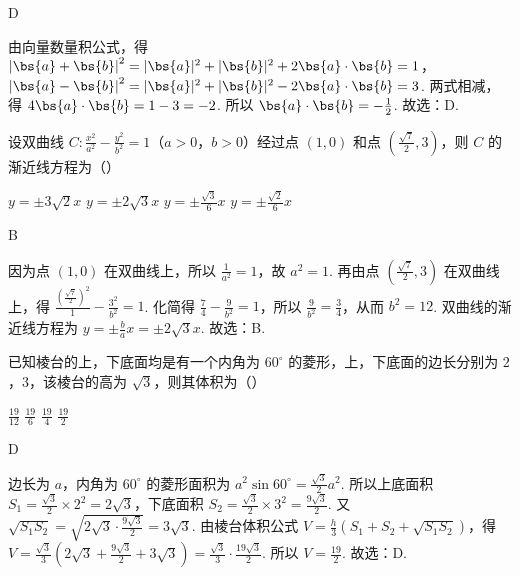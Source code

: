 \documentclass[UTF8,a4paper,oneside,11pt]{ctexbook}
\begin{document}
\begin{answer}
D
\end{answer}

\begin{solution}
由向量数量积公式，得 \(\left| \bs{a}+\bs{b} \right|^2=\lvert \bs{a} \rvert^2+\lvert \bs{b} \rvert^2+2\bs{a}\cdot \bs{b}=1\)，\(\left| \bs{a}-\bs{b} \right|^2=\lvert \bs{a} \rvert^2+\lvert \bs{b} \rvert^2-2\bs{a}\cdot \bs{b}=3\). 两式相减，得 \(4\bs{a}\cdot \bs{b}=1-3=-2\). 所以 \(\bs{a}\cdot \bs{b}=-\frac{1}{2}\). 故选：D.
\end{solution}

\begin{problem}
设双曲线 \(C:\frac{x^2}{a^2}-\frac{y^2}{b^2}=1\)（\(a>0\)，\(b>0\)）经过点 \(\left( 1,0 \right)\) 和点 \(\left( \frac{\sqrt{7}}{2},3 \right)\)，则 \(C\) 的渐近线方程为（\quad）

\choices
    {\(y=\pm 3\sqrt{2}x\)}
    {\(y=\pm 2\sqrt{3}x\)}
    {\(y=\pm \frac{\sqrt{3}}{6}x\)}
    {\(y=\pm \frac{\sqrt{2}}{6}x\)}
\end{problem}

\begin{answer}
B
\end{answer}

\begin{solution}
因为点 \(\left( 1,0 \right)\) 在双曲线上，所以 \(\frac{1}{a^2}=1\)，故 \(a^2=1\).
再由点 \(\left( \frac{\sqrt{7}}{2},3 \right)\) 在双曲线上，得 \(\frac{\left( \frac{\sqrt{7}}{2} \right)^2}{1}-\frac{3^2}{b^2}=1\). 化简得 \(\frac{7}{4}-\frac{9}{b^2}=1\)，所以 \(\frac{9}{b^2}=\frac{3}{4}\)，从而 \(b^2=12\). 双曲线的渐近线方程为 \(y=\pm \frac{b}{a}x=\pm 2\sqrt{3}x\). 故选：B.
\end{solution}

\begin{problem}
已知棱台的上，下底面均是有一个内角为 \(60^\circ\) 的菱形，上，下底面的边长分别为 \(2\)，\(3\)，该棱台的高为 \(\sqrt{3}\)，则其体积为（\quad）

\choices
    {\(\frac{19}{12}\)}
    {\(\frac{19}{6}\)}
    {\(\frac{19}{4}\)}
    {\(\frac{19}{2}\)}
\end{problem}

\begin{answer}
D
\end{answer}

\begin{solution}
边长为 \(a\)，内角为 \(60^\circ\) 的菱形面积为 \(a^2\sin 60^\circ=\frac{\sqrt{3}}{2}a^2\). 所以上底面积 \(S_1=\frac{\sqrt{3}}{2}\times 2^2=2\sqrt{3}\)，下底面积 \(S_2=\frac{\sqrt{3}}{2}\times 3^2=\frac{9\sqrt{3}}{2}\). 又 \(\sqrt{S_1S_2}=\sqrt{2\sqrt{3}\cdot \frac{9\sqrt{3}}{2}}=3\sqrt{3}\). 由棱台体积公式 \(V=\frac{h}{3}\left( S_1+S_2+\sqrt{S_1S_2} \right)\)，得 \(V=\frac{\sqrt{3}}{3}\left( 2\sqrt{3}+\frac{9\sqrt{3}}{2}+3\sqrt{3} \right)=\frac{\sqrt{3}}{3}\cdot \frac{19\sqrt{3}}{2}\). 所以 \(V=\frac{19}{2}\).
故选：D.
\end{solution}
\end{document}
